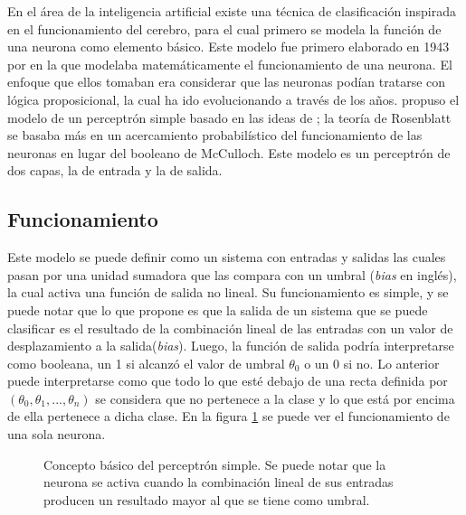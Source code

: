 \par En el área de la inteligencia artificial existe una técnica de clasificación inspirada en el funcionamiento del cerebro, para el cual primero se modela la función de una neurona como elemento básico. Este modelo fue primero elaborado en 1943 por \textcite{mcculloch1943logical} en la que modelaba matemáticamente el funcionamiento de una neurona. El enfoque que ellos tomaban era considerar que las neuronas podían tratarse con lógica proposicional, la cual ha ido evolucionando a través de los años.  \textcite{rosenblatt1958perceptron} propuso el modelo de un perceptrón simple basado en las ideas de \textcite{mcculloch1943logical}; la teoría de Rosenblatt se basaba más en un acercamiento probabilístico del funcionamiento de las neuronas en lugar del booleano de McCulloch. Este modelo es un perceptrón de dos capas, la de entrada y la de salida.

\subsection{Funcionamiento}

\par Este modelo se puede definir como un sistema con entradas y salidas las cuales pasan por una unidad sumadora que las compara con un umbral (\textit{bias} en inglés), la cual activa una función de salida no lineal. Su funcionamiento es simple, y se puede notar que lo que propone es que la salida de un sistema que se puede clasificar es el resultado de la combinación lineal de las entradas con un valor de desplazamiento a la salida(\textit{bias}). Luego, la función de salida podría interpretarse como booleana, un 1 si alcanzó el valor de umbral $\theta_{0}$ o un 0 si no. Lo anterior puede interpretarse como que todo lo que esté debajo de una recta definida por $(\theta_0,\theta_1,...,\theta_n)$ se considera que no pertenece a la clase y lo que está por encima de ella pertenece a dicha clase. En la figura \ref{fig:perceptron} se puede ver el funcionamiento de una sola neurona.
\begin{figure}[H]
	\centering
	
	\caption{Concepto básico del perceptrón simple. Se puede notar que la neurona se activa cuando la combinación lineal de sus entradas producen un resultado mayor al que se tiene como umbral.}
	\label{fig:perceptron}
\end{figure}

